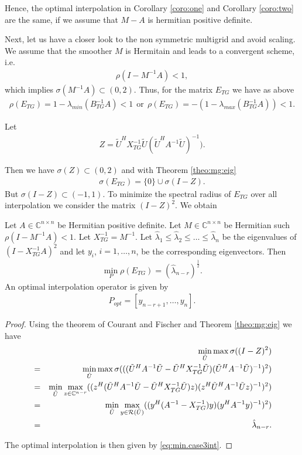 \documentclass[final]{siamltex}
\newcommand{\beqo}{\begin{eqnarray*}}
\newcommand{\beq}{\begin{eqnarray}}
\newcommand{\eeqo}{\end{eqnarray*}}
\newcommand{\eeq}{\end{eqnarray}}
\numberwithin{equation}{section}
\newcommand{\ran} {{\cal R}}
\newcommand{\bC}{\mathbb{C}}
\newcommand{\inCnn}{\in \mathbb{C}^{n \times n}}
\begin{document}
Hence, the optimal interpolation in Corollary \ref{coro:one}  and Corollary \ref{coro:two} are the same, if we assume that $M - A$ is hermitian positive  definite. 

Next, let us have  a closer look to the non symmetric multigrid and avoid scaling. We assume  that
the smoother $M$ is Hermitain  and  leads to a convergent scheme, i.e.
\beq  \label{eq:smoother:con:}
\rho(I - M^{-1}A) < 1, 
\eeq
which implies $\sigma(M^{-1}A) \subset (0,2).$ Thus, for the matrix $E_{TG}$   we have as above
\beqo
\rho(E_{TG}) = 1 - \lambda_{min}(B_{TG}^{-1}A) < 1 
\ \ \mbox{or} \ \
\rho(E_{TG}) = -(1 - \lambda_{max}(B_{TG}^{-1}A)) < 1.
\eeqo

Let 
\beqo
Z = \tilde U^HX_{TG}^{-1}\tilde U (\tilde U^HA^{-1}\tilde U)^{-1}).
\eeqo

Then we have $\sigma(Z) \subset (0,2)$ and with  Theorem \ref{theo:mg:eig}
\beqo
\sigma(E_{TG}) = \{0\} \cup \sigma(I-Z).
\eeqo
But $\sigma(I-Z) \subset (-1,1) $. To minimize the spectral radius of $E_{TG}$ over all interpolation we consider the matrix $(I - Z)^2$. We  obtain



\begin{theorem} \label{theo:main2}
Let  $A\inCnn$  be Hermitian positive definite. Let $ M \inCnn$ be Hermitian such $\rho(I - M^{-1}A) < 1$. 
Let $X_{TG}^{-1} =  M^{-1}$.   
 Let $
\hat \lambda_1 \leq \hat \lambda_2 \leq \ldots \leq  \hat \lambda_n $
be the  eigenvalues of $(I - X_{TG}^{-1}A)^2$  and let $y_i$, $i = 1, \ldots, n$, be the corresponding eigenvectors. Then 
\beq \label{eq:min.case3}
\min_{P}\rho(E_{TG}) = (\hat \lambda_{n-r})^{\frac{1}{2}}.
\eeq
An optimal interpolation operator is given by 
\beq  \label{eq:min.case3int}
P_{opt} = [y_{n-r+1}, \ldots , y_n].
\eeq
\end{theorem}
\begin{proof}
Using the theorem of Courant and Fischer and Theorem \ref{theo:mg:eig} we have
\beqo
& & \min_{\tilde U} \max \sigma((I - Z)^2) \\
& = & \min_{\tilde U} \max \sigma( ((\tilde U^HA^{-1}\tilde U - \tilde U^HX_{TG}^{-1}\tilde U) (\tilde U^HA^{-1}\tilde U)^{-1})^2)\\
& = & \min_{\tilde U} \max_{z \in \bC ^{n-r}}  ((z^H(\tilde U^HA^{-1}\tilde U - \tilde U^HX_{TG}^{-1}\tilde U)z) (z^H\tilde U^HA^{-1}\tilde Uz)^{-1})^2)\\
& = & \min_{\tilde U} \max_{y \in \ran (\tilde U)}  ((y^H(A^{-1} - X_{TG}^{-1})y) (y^HA^{-1}y)^{-1})^2)\\
& = & \hat \lambda_{n-r}.
\eeqo
  
The optimal interpolation is then given by \eqref{eq:min.case3int}.
\end{proof}
\end{document}
